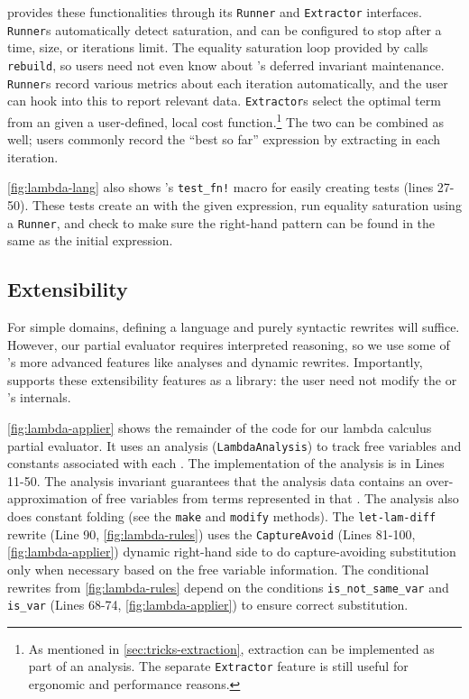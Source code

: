 \egg provides these functionalities through its \texttt{Runner} and
  \texttt{Extractor} interfaces.
\texttt{Runner}s automatically detect saturation, and can be configured to stop
  after a time, \egraph size, or iterations limit.
The equality saturation loop provided by \egg calls \texttt{rebuild}, so users
  need not even know about \egg's deferred invariant maintenance.
\texttt{Runner}s record various metrics about each iteration automatically,
  and the user can hook into this to report relevant data.
\texttt{Extractor}s select the optimal term from an \egraph given a
  user-defined, local cost function.\footnote{
    As mentioned in \autoref{sec:tricks-extraction}, extraction can be
    implemented as part of an \eclass analysis.
    The separate \texttt{Extractor} feature is still useful for ergonomic and
    performance reasons.
  }
The two can be combined as well; users commonly record the ``best so far''
  expression by extracting in each iteration.

\autoref{fig:lambda-lang} also shows \egg's \texttt{test\_fn!}
  macro for easily creating tests (lines 27-50).
These tests create an \egraph with the given expression, run equality saturation
  using a \texttt{Runner}, and check to make sure the right-hand pattern can be
  found in the same \eclass as the initial expression.

\subsection{Extensibility}
\label{sec:egg-extensible}

For simple domains, defining a language and purely syntactic rewrites will
  suffice.
However, our partial evaluator requires interpreted reasoning, so we use some of
  \egg's more advanced features like \eclass analyses and dynamic rewrites.
Importantly, \egg supports these extensibility features as a library:
  the user need not modify the \egraph or \egg's internals.



\autoref{fig:lambda-applier} shows the remainder of the code for our lambda
  calculus partial evaluator.
It uses an \eclass analysis (\texttt{LambdaAnalysis})
  to track free variables and constants associated
  with each \eclass.
The implementation of the \eclass analysis is in Lines 11-50.
The \eclass analysis invariant
  guarantees that the analysis data contains an over-approximation of free variables
  from terms represented in that \eclass.
The analysis also does constant folding
  (see the \texttt{make} and \texttt{modify} methods).
The \texttt{let-lam-diff} rewrite (Line 90, \autoref{fig:lambda-rules})
  uses the \texttt{CaptureAvoid} (Lines 81-100, \autoref{fig:lambda-applier})
  dynamic right-hand side to do capture-avoiding
  substitution only when necessary based on the free variable information.
The conditional rewrites from \autoref{fig:lambda-rules} depend on the
  conditions \texttt{is\_not\_same\_var} and
  \texttt{is\_var} (Lines 68-74, \autoref{fig:lambda-applier})
  to ensure correct substitution.

